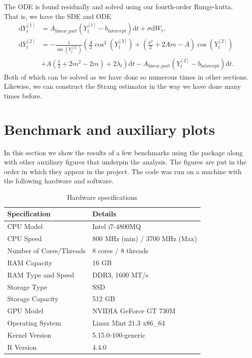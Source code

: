The ODE is found residually and solved using our fourth-order Runge-kutta. That is, we have the SDE and ODE
\begin{align}
    \mathrm{d}Y_t^{[1]} &= A_{\mathrm{linear\_part}}\left(Y_t^{[1]} -  b_{\mathrm{intercept}}\right)\mathrm{d}t + \sigma \mathrm{d}W_t,\\
    \mathrm{d}Y_t^{[2]} &=- \frac{1}{\sin(Y_t^{[2]})}\left(\frac{A}{2}\cos^2(Y_t^{[2]}) + \left(\frac{\sigma^2}{2} + 2 Am - A\right)\cos(Y_t^{[2]}) \right. \nonumber \\
    &+ \left. A \left(\frac{1}{2} + 2m^2 - 2m\right) + 2\lambda_t\right) \mathrm{d}t - A_{\mathrm{linear\_part}}\left(Y_t^{[2]} -  b_{\mathrm{intercept}}\right)\mathrm{d}t  \label{eq:dynamicjacobiODE}.
\end{align}
Both of which can be solved as we have done so numerous times in other sections. Likewise, we can construct the Strang estimator in the way we have done many times before.
\newpage
\section{Benchmark and auxiliary plots}\label{section:benchmark}
In this section we show the results of a few benchmarks using the  package \cite{microbenchmark} along with other auxiliary figures that underpin the analysis. The figures are put in the order in which they appear in the project. The code was run on a machine with the following hardware and software.
\begin{table}[ht]
    \centering
    \begin{tabular}{@{}ll@{}}
    \toprule
    Specification      & Details                              \\ \midrule
    CPU Model          & Intel i7-4800MQ                 \\
    CPU Speed          & 800 MHz (min) / 3700 MHz (Max)     \\
    Number of Cores/Threads & 8 cores / 8 threads              \\
    RAM Capacity       & 16 GB                                \\
    RAM Type and Speed & DDR3, 1600 MT/s                      \\
    Storage Type       & SSD                                  \\
    Storage Capacity   & 512 GB                               \\
    GPU Model          & NVIDIA GeForce GT 730M              \\
    Operating System   & Linux Mint 21.3 x86\_64                   \\
    Kernel Version     & 5.15.0-100-generic                    \\
    R Version          & 4.4.0                                \\
    \bottomrule
    \end{tabular}
    \caption{Hardware specifications}
    \label{tab:specs}
    \end{table}
\newpage
